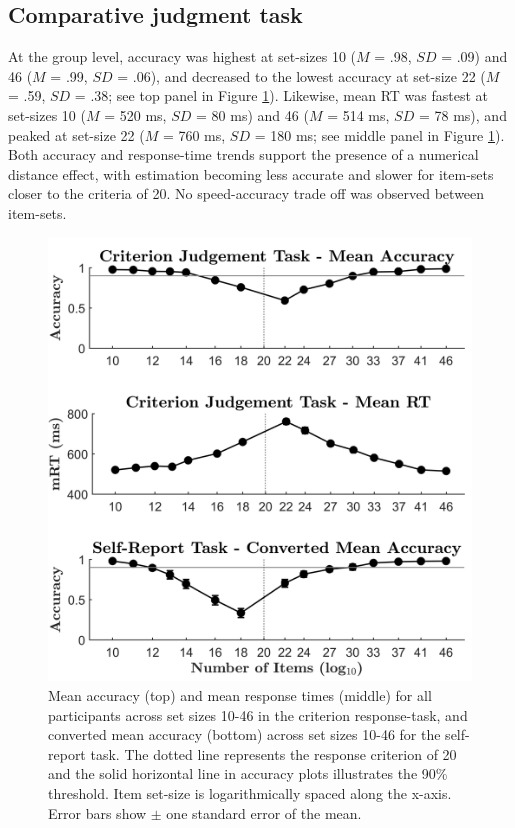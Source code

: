 \subsection{Comparative judgment task}
At the group level, accuracy was highest at set-sizes 10 ($M$ = .98, $SD$ = .09) and 46 ($M$ = .99, $SD$ = .06), and decreased to the lowest accuracy at set-size 22 ($M$ = .59, $SD$ = .38; see top panel in Figure \ref{fig:CritVsExact}). Likewise, mean RT was fastest at set-sizes 10 ($M$ = 520 ms, $SD$ = 80 ms) and 46 ($M$ = 514 ms, $SD$ = 78 ms), and peaked at set-size 22 ($M$ = 760 ms, $SD$ = 180 ms; see middle panel in Figure \ref{fig:CritVsExact}). Both accuracy and response-time trends support the presence of a numerical distance effect, with estimation becoming less accurate and slower for item-sets closer to the criteria of 20. No speed-accuracy trade off was observed between item-sets. 

\begin{figure}[hbt]
\centering \includegraphics[scale = .75]{Figures/Estimation/FIG15JPG.png}
\caption{Mean accuracy (top) and mean response times (middle) for all participants across set sizes 10-46 in the criterion response-task, and converted mean accuracy (bottom) across set sizes 10-46 for the self-report task. The dotted line represents the response criterion of 20 and the solid horizontal line in accuracy plots illustrates the 90\% threshold. Item set-size is logarithmically spaced along the x-axis. Error bars show $\pm$ one standard error of the mean.}
\label{fig:CritVsExact}
\end{figure}

